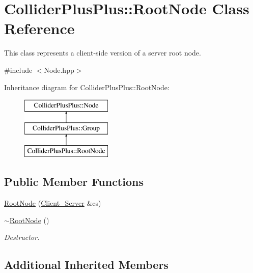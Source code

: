 \hypertarget{classColliderPlusPlus_1_1RootNode}{\section{Collider\-Plus\-Plus\-:\-:Root\-Node Class Reference}
\label{classColliderPlusPlus_1_1RootNode}
}


This class represents a client-\/side version of a server root node.  




{\ttfamily \#include $<$Node.\-hpp$>$}

Inheritance diagram for Collider\-Plus\-Plus\-:\-:Root\-Node\-:\begin{figure}[H]
\begin{center}
\leavevmode
\includegraphics[height=3.000000cm]{classColliderPlusPlus_1_1RootNode}
\end{center}
\end{figure}
\subsection*{Public Member Functions}
\begin{DoxyCompactItemize}
\item 
\hyperlink{classColliderPlusPlus_1_1RootNode_aa97f9548a3ef575cd86dead75a328cf5}{Root\-Node} (\hyperlink{classColliderPlusPlus_1_1Client__Server}{Client\-\_\-\-Server} \&cs)
\item 
\hypertarget{classColliderPlusPlus_1_1RootNode_a0b1f3caa18d7176ec4766990cadb48c4}{\hyperlink{classColliderPlusPlus_1_1RootNode_a0b1f3caa18d7176ec4766990cadb48c4}{$\sim$\-Root\-Node} ()}\label{classColliderPlusPlus_1_1RootNode_a0b1f3caa18d7176ec4766990cadb48c4}

\begin{DoxyCompactList}\small\item\em Destructor. \end{DoxyCompactList}\end{DoxyCompactItemize}
\subsection*{Additional Inherited Members}


